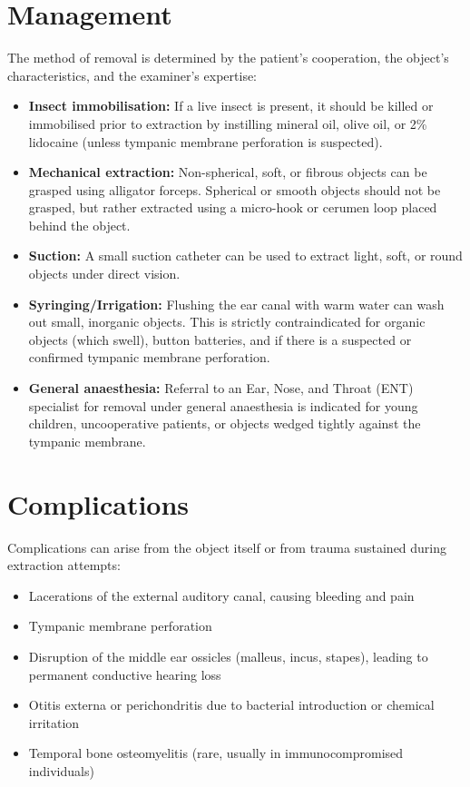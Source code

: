 \section*{Management}
The method of removal is determined by the patient's cooperation, the object's characteristics, and the examiner's expertise:
\begin{itemize}
    \item \textbf{Insect immobilisation:} If a live insect is present, it should be killed or immobilised prior to extraction by instilling mineral oil, olive oil, or 2\% lidocaine (unless tympanic membrane perforation is suspected).
    \item \textbf{Mechanical extraction:} Non-spherical, soft, or fibrous objects can be grasped using alligator forceps. Spherical or smooth objects should not be grasped, but rather extracted using a micro-hook or cerumen loop placed behind the object.
    \item \textbf{Suction:} A small suction catheter can be used to extract light, soft, or round objects under direct vision.
    \item \textbf{Syringing/Irrigation:} Flushing the ear canal with warm water can wash out small, inorganic objects. This is strictly contraindicated for organic objects (which swell), button batteries, and if there is a suspected or confirmed tympanic membrane perforation.
    \item \textbf{General anaesthesia:} Referral to an Ear, Nose, and Throat (ENT) specialist for removal under general anaesthesia is indicated for young children, uncooperative patients, or objects wedged tightly against the tympanic membrane.
\end{itemize}

\section*{Complications}
Complications can arise from the object itself or from trauma sustained during extraction attempts:
\begin{itemize}
    \item Lacerations of the external auditory canal, causing bleeding and pain
    \item Tympanic membrane perforation
    \item Disruption of the middle ear ossicles (malleus, incus, stapes), leading to permanent conductive hearing loss
    \item Otitis externa or perichondritis due to bacterial introduction or chemical irritation
    \item Temporal bone osteomyelitis (rare, usually in immunocompromised individuals)
\end{itemize}

